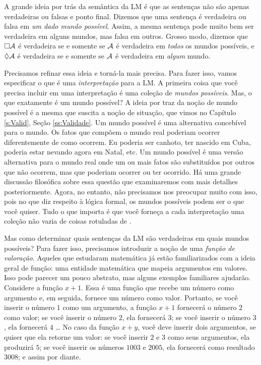 A grande ideia por trás da semântica da LM é que as sentenças não são apenas verdadeiras ou falsas e ponto final.  Dizemos que uma  sentença é verdadeira ou falsa em \emph{um dado mundo possível}. Assim,  a mesma sentença pode muito bem ser verdadeira em alguns mundos,  mas falsa em outros. Grosso modo, dizemos que $\Box \mathcal{A}$ é verdadeira   se e somente se $\mathcal{A}$ é verdadeira em \emph{todos} os mundos possíveis, e $\Diamond\mathcal{A}$ é verdadeira se e somente se  $\mathcal{A}$ é verdadeira em \emph{algum} mundo.

Precisamos refinar essa ideia e torná-la mais precisa. Para fazer isso,  vamos especificar o que é uma  \emph{interpretação} para a LM. A primeira coisa que você precisa incluir em uma interpretação é uma coleção de \emph{mundos possíveis}. 
Mas, o que exatamente é um mundo possível? A ideia por traz da noção de mundo possível é a mesma que suscita a noção de situação, que vimos no Capítulo \ref{s:Valid}, Seção \ref{ss:Validade}. Um mundo possível é uma alternativa concebível para o mundo. Os fatos que compõem o mundo real poderiam ocorrer diferentemente de como ocorrem. Eu poderia ser canhoto, ter nascido em Cuba, poderia estar nevando agora em Natal, etc. Um mundo possível é uma versão alternativa para o mundo real onde um ou mais fatos são substituídos por outros que não ocorrem, mas que poderiam ocorrer ou ter ocorrido. 
Há uma grande discussão filosófica sobre  essa questão que examinaremos com mais detalhes posteriormente. Agora, no entanto,  não precisamos nos preocupar muito com isso, pois no que diz respeito à lógica formal, os mundos possíveis podem ser o que você quiser. Tudo o que importa é que você forneça a cada interpretação uma coleção não vazia de coisas rotuladas  de  .


Mas como determinar quais sentenças da LM são verdadeiras em quais mundos possíveis? Para fazer isso, precisamos introduzir a noção de uma \emph{função de valoração}. Aqueles que estudaram matemática já estão familiarizados com a ideia geral de função: uma entidade matemática que mapeia argumentos em valores. Isso pode parecer um pouco abstrato, mas alguns exemplos familiares ajudarão. Considere a função $x + 1$. Essa é uma função que recebe um número como argumento e, em seguida, fornece um número como valor. Portanto, se você inserir o número $1$ como um argumento, a função $x + 1$ fornecerá o número $2$ como valor; se você inserir o número  $2$, ela fornecerá $3$; se você inserir o número  $3$, ela fornecerá $4$ \dots{}  No caso da função $x + y$, você deve inserir dois argumentos, se quiser que ela retorne um valor: se você inserir $2$ e $3$ como seus argumentos, ela produzirá $5$; se você inserir os números  $1003$ e $2005$, ela fornecerá como resultado $3008$; e assim por diante.

